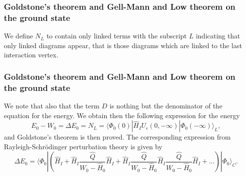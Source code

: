 \documentclass[compress]{beamer}
\newcommand*{\ket}[1]{|#1\rangle}
\newcommand*{\bra}[1]{\langle#1|}
\begin{document}
\frame
{
\frametitle{Goldstone's theorem and Gell-Mann and Low theorem on the ground state}
\begin{small}
{\scriptsize
We define  $N_L$ to contain only linked terms
with the subscript $L$ indicating that only linked diagrams appear, that is those diagrams which are linked to the last interaction vertex.
}
\end{small}
}
\frame
{
\frametitle{Goldstone's theorem and Gell-Mann and Low theorem on the ground state}
\begin{small}
{\scriptsize
We note that also that the term $D$ is nothing but the denominator of the equation for the energy. We obtain then the following expression for the energy
\[
E_0-W_0=\Delta E_0=N_L= \bra{\Phi_0(0)}\hat{H}_IU_{\epsilon}(0,-\infty )\ket{\Phi_0(-\infty)}_L,
\]
and Goldstone's theorem is then proved. 
The corresponding expression from Rayleigh-Schr\"odinger perturbation theory is given by
\[
\Delta E_0=\langle \Phi_0|\left(\hat{H}_I+\hat{H}_I\frac{\hat{Q}}{W_0-\hat{H}_0}\hat{H}_I+
\hat{H}_I\frac{\hat{Q}}{W_0-\hat{H}_0}\hat{H}_I\frac{\hat{Q}}{W_0-\hat{H}_0}\hat{H}_I+\dots\right)|\Phi_0\rangle_C.
\]
}
\end{small}
}
\end{document}
